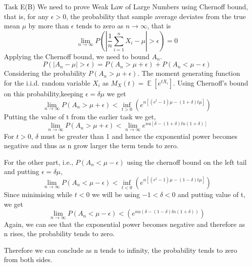 \begin{task}{Task E(B)}
 We need to prove Weak Law of Large Numbers using Chernoff bound, that is, for
 any $\epsilon>0$, the probability that sample average deviates from the true
 mean $\mu$ by more than $\epsilon$ tends to zero as $n\rightarrow \infty$,
 that is
 \begin{equation}
     \lim_{n\to\infty}P(|\frac{1}{n}\sum_{i=1}^{n}X_{i}-\mu|>\epsilon)=0  
 \end{equation}
 Applying the Chernoff bound, we need to bound $A_{n}$.
 \begin{equation}
     P(|A_{n}-\mu|> \epsilon )=P(A_{n}>\mu+\epsilon)+P(A_{n}<\mu - \epsilon)
 \end{equation}
 Considering the probability $P(A_{n}>\mu+\epsilon)$. The moment generating function for the i.i.d. random variable $X_{i}$ as $M_{X}(t)=\mathop{\mathbb{E}}[e^{tX_{i}}]$. Using Chernoff's bound on this probability,keeping $\epsilon=\delta\mu$ we get
 \begin{equation}
     \lim_{n\to\infty}P(A_{n}>\mu+\epsilon)< \inf_{t>0}(e^{n[(e^{t}-1)\mu - (1+\delta)t\mu]})
 \end{equation}
 Putting the value of t from the earlier task we get,
 \begin{equation}      
    \lim_{n\to\infty}P(A_{n}>\mu+\epsilon)<\lim_{n\to\infty}e^{nu[\delta-(1+\delta)ln(1+\delta)]}
 \end{equation}
 For $t>0$, $\delta $ must be greater than 1 and hence the exponential power becomes negative and thus as n grow larger the term tends to zero.
 \par For the other part, i.e., $P(A_{n}<\mu - \epsilon)$ using the chernoff bound on the left tail and putting $\epsilon=\delta\mu$,
 \begin{equation}
     \lim_{n\to\infty}P(A_{n}<\mu - \epsilon)< \inf_{t<0}(e^{n[(e^{t}-1)\mu - (1 -\delta)t\mu]})
 \end{equation}
 Since minimising while $t<0$ we will be using $-1<\delta<0$ and putting value of t, we get
 \begin{equation}
     \lim_{n\to\infty}P(A_{n}<\mu - \epsilon)<(e^{nu(\delta-(1-\delta) ln(1+\delta))})
 \end{equation}
 Again, we can see that the exponential power becomes negative and therefore as n rises, the probability tends to zero.
 \par Therefore we can conclude as n tends to infinity, the probability tends to zero from both sides.
\end{task}
